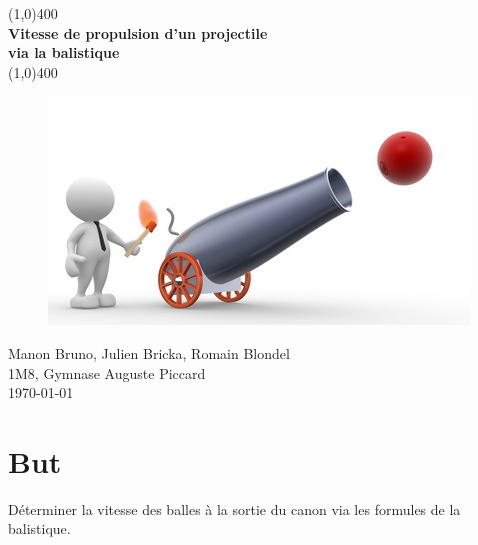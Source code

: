 \documentclass[11pt]{article}
\begin{document}
\begin{titlepage}
\begin{center}
\vspace{1cm}
\vfill
\line(1,0){400}\\
\huge{\textbf{Vitesse de propulsion d'un projectile \\ via la balistique}}\\
\line(1,0){400}\\
\vfill
\vfill
\begin{figure}[H]
  \includegraphics[scale=1]{cannon.png}
\end{figure}
\vfill
Manon Bruno, Julien Bricka, Romain Blondel\\
1M8, Gymnase Auguste Piccard\\
\today
\end{center}
\end{titlepage}

\tableofcontents
\thispagestyle{empty}
\clearpage

\setcounter{page}{1}

\section{But}
Déterminer la vitesse des balles à la sortie du canon  via les formules de la balistique.
\end{document}
